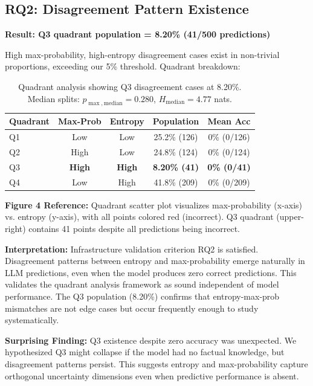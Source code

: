 \subsection{RQ2: Disagreement Pattern Existence}

\textbf{Result: Q3 quadrant population = 8.20\% (41/500 predictions)}

High max-probability, high-entropy disagreement cases exist in non-trivial proportions, exceeding our 5\% threshold. Quadrant breakdown:

\begin{table}[h]
\centering
\small
\begin{tabular}{lcccc}
\toprule
\textbf{Quadrant} & \textbf{Max-Prob} & \textbf{Entropy} & \textbf{Population} & \textbf{Mean Acc} \\
\midrule
Q1 & Low & Low & 25.2\% (126) & 0\% (0/126) \\
Q2 & High & Low & 24.8\% (124) & 0\% (0/124) \\
Q3 & \textbf{High} & \textbf{High} & \textbf{8.20\% (41)} & \textbf{0\% (0/41)} \\
Q4 & Low & High & 41.8\% (209) & 0\% (0/209) \\
\bottomrule
\end{tabular}
\caption{Quadrant analysis showing Q3 disagreement cases at 8.20\%. Median splits: $p_{\max,\text{median}} = 0.280$, $H_{\text{median}} = 4.77$ nats.}
\end{table}

\textbf{Figure 4 Reference:} Quadrant scatter plot visualizes max-probability (x-axis) vs. entropy (y-axis), with all points colored red (incorrect). Q3 quadrant (upper-right) contains 41 points despite all predictions being incorrect.

\textbf{Interpretation:} Infrastructure validation criterion RQ2 is satisfied. Disagreement patterns between entropy and max-probability emerge naturally in LLM predictions, even when the model produces zero correct predictions. This validates the quadrant analysis framework as sound independent of model performance. The Q3 population (8.20\%) confirms that entropy-max-prob mismatches are not edge cases but occur frequently enough to study systematically.

\textbf{Surprising Finding:} Q3 existence despite zero accuracy was unexpected. We hypothesized Q3 might collapse if the model had no factual knowledge, but disagreement patterns persist. This suggests entropy and max-probability capture orthogonal uncertainty dimensions even when predictive performance is absent.

